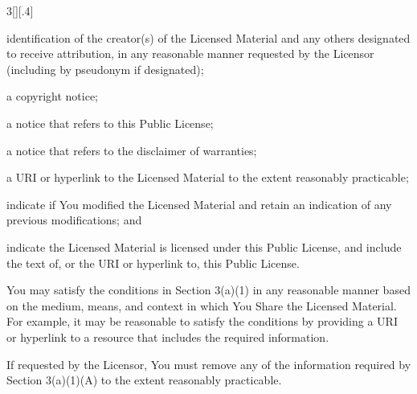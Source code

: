 \documentclass[8pt,a4paper]{article}
\begin{document}
\begin{multicols}{3}[][.4\paperwidth]
\begin{longenum}
\begin{longenum}
\begin{longenum}
\begin{longenum}
                 \begin{longenum}

                 \item identification of the creator(s) of the Licensed
                       Material and any others designated to receive
                       attribution, in any reasonable manner requested by
                       the Licensor (including by pseudonym if
                       designated);

                 \item a copyright notice;

                 \item a notice that refers to this Public License;

                 \item a notice that refers to the disclaimer of
                       warranties;

                 \item a URI or hyperlink to the Licensed Material to the
                       extent reasonably practicable;

                 \end{longenum}

            \item indicate if You modified the Licensed Material and
               retain an indication of any previous modifications; and

            \item indicate the Licensed Material is licensed under this
               Public License, and include the text of, or the URI or
               hyperlink to, this Public License.

            \end{longenum}

       \item You may satisfy the conditions in Section 3(a)(1) in any
          reasonable manner based on the medium, means, and context in
          which You Share the Licensed Material. For example, it may be
          reasonable to satisfy the conditions by providing a URI or
          hyperlink to a resource that includes the required
          information.

       \item If requested by the Licensor, You must remove any of the
          information required by Section 3(a)(1)(A) to the extent
          reasonably practicable.

       \end{longenum}


\end{longenum}
\end{longenum}
\end{multicols}
\end{document}
